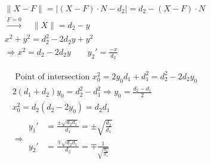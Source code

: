 \documentclass[twoside]{amsart}
\theoremstyle{plain}
\theoremstyle{definition}
\begin{document}
\[
\begin{gathered}
  \| X- F \| = |(X-F)\cdot N - d_2| = d_2 - (X-F)\cdot N \\
  \xrightarrow{ F = 0 } \quad \| X \| = d_2 - y \\
  x^2 + y^2 = d_2^2 - 2d_2 y + y^2 \\
  \Longrightarrow x^2 = d_2 - 2d_2 y \quad \quad y_2' = \frac{-x}{d_2}
\end{gathered}
\]

\[
\begin{gathered}
  \text{ Point of intersection } x_0^2 = 2y_0 d_1 + d_1^2 = d_2^2 -2d_2 y_0 \\
  2(d_1 + d_2) y_0 = d_2^2 - d_1^2  \Longrightarrow y_0 = \frac{d_2 -d_1}{2} \\
  x_0^2 = d_2(d_2-2y_0) = d_2 d_1 \\
  \Longrightarrow 
\begin{aligned}
  y_1' & = \frac{ \pm \sqrt{d_2 d_1}}{ d_1} = \pm \sqrt{ \frac{d_2}{ d_1 } } \\
  y_2' & = \frac{ \mp \sqrt{ d_2 d_1}}{ d_2} = \mp \frac{1}{ \sqrt{ \frac{d_2}{d_1} } }
\end{aligned}
\end{gathered}
\]
\end{document}
